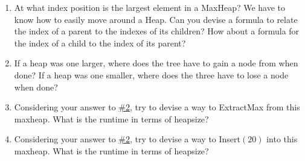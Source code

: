 \documentclass[12pt]{report}
\begin{document}
\begin{enumerate}[label=\arabic*.]
    \item At what index position is the largest element in a MaxHeap? We have to know how to easily move around a Heap. Can you devise a formula to relate the index of a parent to the indexes of its children? How about a formula for the index of a child to the index of its parent? 
	\item\label{prb:2} If a heap was one larger, where does the tree have to gain a node from when done? If a heap was one smaller, where does the three have to lose a node when done?
	\item Considering your answer to \hyperref[prb:2]{\#2}, try to devise a way to ExtractMax from this maxheap. What is the runtime in terms of heapsize?
	\item Considering your answer to \hyperref[prb:2]{\#2}, try to devise a way to Insert$(20)$ into this maxheap. What is the runtime in terms of heapsize?
\end{enumerate}
\end{document}
